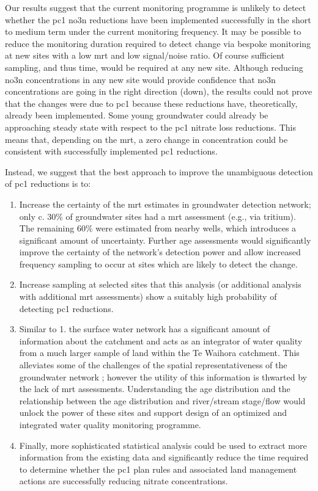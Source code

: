 Our results suggest that the current monitoring programme is unlikely to detect whether the \gls{pc1} \gls{no3n} reductions have been implemented successfully in the short to medium term under the current monitoring frequency.
It may be possible to reduce the monitoring duration required to detect change via bespoke monitoring at new sites with a low \gls{mrt} and low signal/noise ratio.
Of course sufficient sampling, and thus time, would be required at any new site.
Although reducing \gls{no3n} concentrations in any new site would provide confidence that \gls{no3n} concentrations are going in the right direction (down), the results could not prove that the changes were due to \gls{pc1} because these reductions have, theoretically, already been implemented.
Some young groundwater could already be approaching steady state with respect to the \gls{pc1} nitrate loss reductions.
This means that, depending on the \gls{mrt}, a zero change in concentration could be consistent with successfully implemented \gls{pc1} reductions.

Instead, we suggest that the best approach to improve the unambiguous detection of \gls{pc1} reductions is to:
\begin{enumerate}
    \item Increase the certainty of the \gls{mrt} estimates in groundwater detection network; only c. 30\% of groundwater sites had a \gls{mrt} assessment (e.g., via tritium). The remaining 60\% were estimated from nearby wells, which introduces a significant amount of uncertainty. Further age assessments would significantly improve the certainty of the network's detection power and allow increased frequency sampling to occur at sites which are likely to detect the change.
    \item Increase sampling at selected sites that this analysis (or additional analysis with additional \gls{mrt} assessments) show a suitably high probability of detecting \gls{pc1} reductions.
    \item Similar to 1. the surface water network has a significant amount of information about the catchment and acts as an integrator of water quality from a much larger sample of land within the Te Waihora catchment. This alleviates some of the challenges of the spatial representativeness of the groundwater network \citep{olw_guidance}; however the utility of this information is thwarted by the lack of \gls{mrt} assessments. Understanding the age distribution and the relationship between the age distribution and river/stream stage/flow would unlock the power of these sites and support design of an optimized and integrated water quality monitoring programme.
    \item Finally, more sophisticated statistical analysis could be used to extract more information from the existing data and significantly reduce the time required to determine whether the \gls{pc1} plan rules and associated land management actions are successfully reducing nitrate concentrations.
\end{enumerate}




